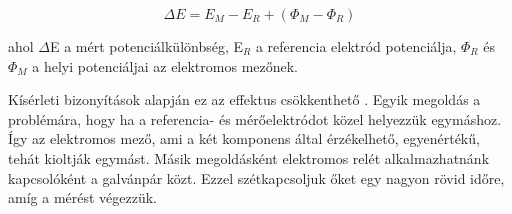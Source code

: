 \begin{equation}
\Delta E = E_M - E_R + (\Phi_M - \Phi_R) 
\label{eq:field1}
\end{equation}

ahol $\Delta$E a mért potenciálkülönbség, E$_R$ a referencia elektród potenciálja, $\Phi_R$ és $\Phi_M$ a helyi potenciáljai az elektromos mezőnek. 

Kísérleti bizonyítások alapján ez az effektus csökkenthető \cite{kiss2017effect}. Egyik megoldás a problémára, hogy ha a referencia- és mérőelektródot közel helyezzük egymáshoz. Így az elektromos mező, ami a két komponens által érzékelhető, egyenértékű, tehát kioltják egymást. Másik megoldásként elektromos relét alkalmazhatnánk kapcsolóként a galvánpár közt. Ezzel szétkapcsoljuk őket egy nagyon rövid időre, amíg a mérést végezzük.




